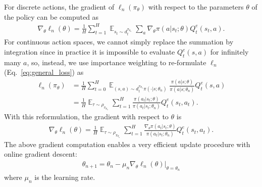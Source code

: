 \documentclass{article}
\newcommand{\BB}[1]{\textcolor{red}{\bf Byron: {#1}}}
\begin{document}
For discrete actions, the gradient of $\ell_n(\pi_{\theta})$ with respect to the parameters $\theta$ of the policy can be computed as
\begin{align}
\label{eq:regular_dic_gradient}
\nabla_{\theta}\ell_n(\theta) =\frac{1}{H} \sum_{t=1}^H\mathop{\mathbb{E}}_{s_t\sim d_t^{\pi_{\theta_n}}}\sum_{a}\nabla_{\theta}\pi(a|s_t;\theta) Q_t^e(s_t, a).
\end{align}
For continuous action spaces, we cannot simply replace the summation by integration since in practice it is impossible to evaluate $Q_t^e(s,a)$ for infinitely many $a$, %
so, instead, we use importance weighting to re-formulate $\ell_n$ (Eq.~\ref{eq:general_loss}) as
\begin{align}
\ell_n(\pi_{\theta})&=\frac{1}{H}\sum_{t=0}^H\mathop{\mathbb{E}}_{(s,a)\sim d_t^{\pi_{\theta_n}}\pi(\cdot|s;\theta_n)}\frac{\pi(a|s;\theta)}{\pi(a|s;\theta_n)}Q^e_t(s,a) \nonumber \\
&= \frac{1}{H}\mathop{\mathbb{E}}_{\tau\sim\rho_{\pi_{\theta_n}}}\sum_{t=1}^H \frac{\pi(a_t|s_t;\theta)}{\pi(a_t|s_t;\theta_n)}Q^e_t(s_t,a_t).
\end{align} 
With this reformulation, the gradient with respect to $\theta$ is
\begin{align}
\label{eq:regular_con_gradient}
\nabla_{\theta}\ell_n(\theta) =\frac{1}{H} \mathop{\mathbb{E}}_{\tau\sim\rho_{\pi_{\theta_n}}}\sum_{t=1}^H \frac{\nabla_{\theta}\pi(a_t|s_t;\theta)}{\pi(a_t|s_t;\theta_n)}Q^e_t(s_t,a_t).
\end{align}
The above gradient computation enables a very efficient update procedure with online gradient descent:
\begin{align}
\label{eq:ogd_form}
\theta_{n+1} = \theta_n - \mu_n \nabla_{\theta}\ell_n(\theta)|_{\theta = \theta_n}
\end{align} where $\mu_n$ is the learning rate.
\end{document}
